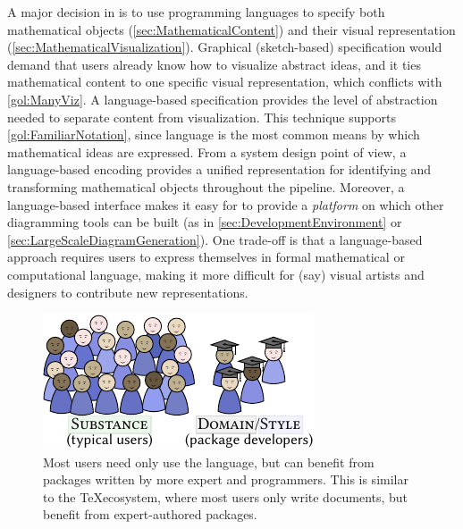 A major decision in \Penrose{} is to use programming languages to specify both mathematical objects (\cref{sec:MathematicalContent}) and their visual representation (\cref{sec:MathematicalVisualization}).  Graphical (\eg sketch-based) specification would demand that users already know how to visualize abstract ideas, and it ties mathematical content to one specific visual representation, which conflicts with \ref{gol:ManyViz}.  A language-based specification provides the level of abstraction needed to separate content from visualization. This technique supports \ref{gol:FamiliarNotation}, since language is the most common means by which mathematical ideas are expressed.  From a system design point of view, a language-based encoding provides a unified representation for identifying and transforming mathematical objects throughout the pipeline.  Moreover, a language-based interface makes it easy for \Penrose{} to provide a \emph{platform} on which other diagramming tools can be built (as in \cref{sec:DevelopmentEnvironment} or \cref{sec:LargeScaleDiagramGeneration}).  One trade-off is that a language-based approach requires users to express themselves in formal mathematical or computational language, making it more difficult for (say) visual artists and designers to contribute new representations.

\begin{figure}[b]
  \begin{minipage}[c]{.35\linewidth}
    \caption{Most \Penrose{} users need only use the \Substance{} language, but can benefit from packages written by more expert \Domain{} and \Style{} programmers. This is similar to the \TeX ecosystem, where most users only write documents, but benefit from expert-authored packages.\label{fig:NoviceExpertUsers}}
  \end{minipage}\hfill
  \begin{minipage}[c]{.55\linewidth}
     \includegraphics[scale=1.5]{assets/penrose/NoviceExpertUsers.pdf}
  \end{minipage}\hfill
\end{figure}

